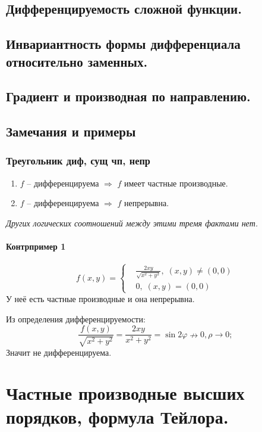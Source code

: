 \documentclass{article}
\newcommand{\ii}{\textit}
\begin{document}
\newpage
\subsection{Дифференцируемость сложной функции.}

\newpage
\subsection{Инвариантность формы дифференциала относительно заменных.}

\newpage
\subsection{Градиент и производная по направлению.}

\newpage
\subsection{Замечания и примеры}
\subsubsection{Треугольник диф, сущ чп, непр}
\begin{enumerate}
    \item $f$ -- дифференцируема $\Rightarrow$ $f$ имеет частные производные.
    \item $f$ -- дифференцируема $\Rightarrow$ $f$ непрерывна.
\end{enumerate}
\ii{Других логических соотношений между этими тремя фактами нет.}
\paragraph*{Контрпример 1}
\begin{equation*}
    f(x,y) = \left\{
    \begin{aligned}
         & \frac{2xy}{\sqrt{x^2 + y^2}}, \; (x,y) \neq (0,0) \\
         & 0, \; (x,y) = (0,0)
    \end{aligned}
    \right.
\end{equation*}
У неё есть частные производные и она непрерывна.

Из определения дифференцируемости:
$$\frac{f(x,y)}{\sqrt{x^2+y^2}} = \frac{2xy}{x^2 + y^2} = \sin{2\varphi} \nrightarrow 0, \rho \rightarrow 0; $$
Значит не дифференцируема.

\newpage
\section{Частные производные высших порядков, формула Тейлора.}
\end{document}
